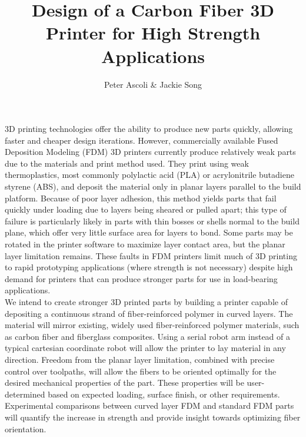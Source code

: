 \documentclass[letter,10pt,english]{article}
\begin{document}
\title{Design of a Carbon Fiber 3D Printer for High Strength Applications}
\author{Peter Ascoli \& Jackie Song}
\date{}

\maketitle

\thispagestyle{fancy}


3D printing technologies offer the ability to produce new parts quickly, allowing faster and cheaper design iterations. However, commercially available Fused Deposition Modeling (FDM) 3D printers currently produce relatively weak parts due to the materials and print method used. They print using weak thermoplastics, most commonly polylactic acid (PLA) or acrylonitrile butadiene styrene (ABS), and deposit the material only in planar layers parallel to the build platform. Because of poor layer adhesion, this method yields parts that fail quickly under loading due to layers being sheared or pulled apart; this type of failure is particularly likely in parts with thin bosses or shells normal to the build plane, which offer very little surface area for layers to bond. Some parts may be rotated in the printer software to maximize layer contact area, but the planar layer limitation remains. These faults in FDM printers limit much of 3D printing to rapid prototyping applications (where strength is not necessary) despite high demand for printers that can produce stronger parts for use in load-bearing applications.\\


We intend to create stronger 3D printed parts by building a printer capable of depositing a continuous strand of fiber-reinforced polymer in curved layers. The material will mirror existing, widely used fiber-reinforced polymer materials, such as carbon fiber and fiberglass composites. Using a serial robot arm instead of a typical cartesian coordinate robot will allow the printer to lay material in any direction. Freedom from the planar layer limitation, combined with precise control over toolpaths, will allow the fibers to be oriented optimally for the desired mechanical properties of the part. These properties will be user-determined based on expected loading, surface finish, or other requirements. Experimental comparisons between curved layer FDM and standard FDM parts will quantify the increase in strength and provide insight towards optimizing fiber orientation.\\
\end{document}
